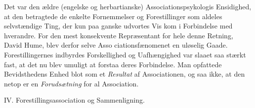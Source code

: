 \documentclass[12pt,a4paper,openany]{book}
\newcommand{\opage}[1]{\marginnote{\footnotesize\textit{[#1]}}}
\begin{document}
Det var den ældre (engelske og herbartianske) Associationspsykologis
Ensidighed, at den betragtede de enkelte Fornemmelser og Forestillinger som
aldeles selvstændige Ting, der kun paa ganske udvortes Vis kom i Forbindelse
med hverandre. For den mest konsekvente Repræsentant for hele denne Retning,
David Hume, blev derfor selve Asso%
\setcounter{footnote}{0}%
\opage{59}ciationsfænomenet en uløselig Gaade. Forestillingernes indbyrdes
Forskellighed og Uafhængighed var slaaet saa stærkt fast, at det nu blev
umuligt at forstaa deres Forbindelse. Man opfattede Bevidsthedens Enhed blot
som et \emph{Resultat} af Associationen, og saa ikke, at den netop er en
\emph{Forudsætning} for al Association.

\begin{center}\large IV. Forestillingsassociation og Sammenligning.\end{center}
\end{document}
